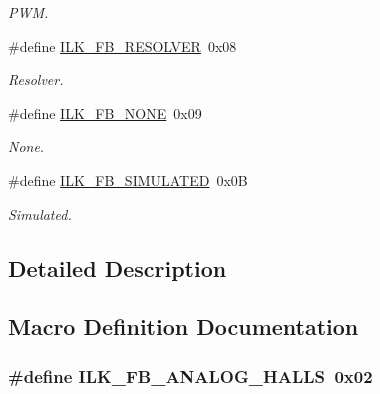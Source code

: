 \begin{DoxyCompactItemize}
\begin{DoxyCompactList}\small\item\em P\+WM. \end{DoxyCompactList}\item 
\#define \hyperlink{group__IL__CONST__FB_ga50a41df2322b1b41b9ec93ec2fbe4811}{I\+L\+K\+\_\+\+F\+B\+\_\+\+R\+E\+S\+O\+L\+V\+ER}~0x08
\begin{DoxyCompactList}\small\item\em Resolver. \end{DoxyCompactList}\item 
\#define \hyperlink{group__IL__CONST__FB_ga4caccef6137e2cce88d4c230fe9be977}{I\+L\+K\+\_\+\+F\+B\+\_\+\+N\+O\+NE}~0x09
\begin{DoxyCompactList}\small\item\em None. \end{DoxyCompactList}\item 
\#define \hyperlink{group__IL__CONST__FB_gaa3a26923923455feb238d74ec5d64a3c}{I\+L\+K\+\_\+\+F\+B\+\_\+\+S\+I\+M\+U\+L\+A\+T\+ED}~0x0B
\begin{DoxyCompactList}\small\item\em Simulated. \end{DoxyCompactList}\end{DoxyCompactItemize}


\subsection{Detailed Description}


\subsection{Macro Definition Documentation}
\subsubsection[{\texorpdfstring{I\+L\+K\+\_\+\+F\+B\+\_\+\+A\+N\+A\+L\+O\+G\+\_\+\+H\+A\+L\+LS}{ILK_FB_ANALOG_HALLS}}]{\setlength{\rightskip}{0pt plus 5cm}\#define I\+L\+K\+\_\+\+F\+B\+\_\+\+A\+N\+A\+L\+O\+G\+\_\+\+H\+A\+L\+LS~0x02}\hypertarget{group__IL__CONST__FB_gada00d2cfc8c349a4976600232b399a2c}{}\label{group__IL__CONST__FB_gada00d2cfc8c349a4976600232b399a2c}


